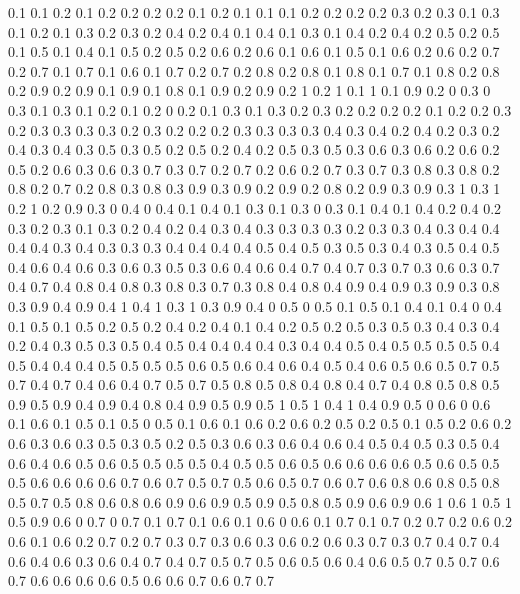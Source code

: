 0.1 0.1
0.2 0.1
0.2 0.2
0.2 0.2
0.1 0.2
0.1 0.1
0.1 0.2
0.2 0.2
0.2 0.3
0.2 0.3
0.1 0.3
0.1 0.2
0.1 0.3
0.2 0.3
0.2 0.4
0.2 0.4
0.1 0.4
0.1 0.3
0.1 0.4
0.2 0.4
0.2 0.5
0.2 0.5
0.1 0.5
0.1 0.4
0.1 0.5
0.2 0.5
0.2 0.6
0.2 0.6
0.1 0.6
0.1 0.5
0.1 0.6
0.2 0.6
0.2 0.7
0.2 0.7
0.1 0.7
0.1 0.6
0.1 0.7
0.2 0.7
0.2 0.8
0.2 0.8
0.1 0.8
0.1 0.7
0.1 0.8
0.2 0.8
0.2 0.9
0.2 0.9
0.1 0.9
0.1 0.8
0.1 0.9
0.2 0.9
0.2 1
0.2 1
0.1 1
0.1 0.9
0.2 0
0.3 0
0.3 0.1
0.3 0.1
0.2 0.1
0.2 0
0.2 0.1
0.3 0.1
0.3 0.2
0.3 0.2
0.2 0.2
0.2 0.1
0.2 0.2
0.3 0.2
0.3 0.3
0.3 0.3
0.2 0.3
0.2 0.2
0.2 0.3
0.3 0.3
0.3 0.4
0.3 0.4
0.2 0.4
0.2 0.3
0.2 0.4
0.3 0.4
0.3 0.5
0.3 0.5
0.2 0.5
0.2 0.4
0.2 0.5
0.3 0.5
0.3 0.6
0.3 0.6
0.2 0.6
0.2 0.5
0.2 0.6
0.3 0.6
0.3 0.7
0.3 0.7
0.2 0.7
0.2 0.6
0.2 0.7
0.3 0.7
0.3 0.8
0.3 0.8
0.2 0.8
0.2 0.7
0.2 0.8
0.3 0.8
0.3 0.9
0.3 0.9
0.2 0.9
0.2 0.8
0.2 0.9
0.3 0.9
0.3 1
0.3 1
0.2 1
0.2 0.9
0.3 0
0.4 0
0.4 0.1
0.4 0.1
0.3 0.1
0.3 0
0.3 0.1
0.4 0.1
0.4 0.2
0.4 0.2
0.3 0.2
0.3 0.1
0.3 0.2
0.4 0.2
0.4 0.3
0.4 0.3
0.3 0.3
0.3 0.2
0.3 0.3
0.4 0.3
0.4 0.4
0.4 0.4
0.3 0.4
0.3 0.3
0.3 0.4
0.4 0.4
0.4 0.5
0.4 0.5
0.3 0.5
0.3 0.4
0.3 0.5
0.4 0.5
0.4 0.6
0.4 0.6
0.3 0.6
0.3 0.5
0.3 0.6
0.4 0.6
0.4 0.7
0.4 0.7
0.3 0.7
0.3 0.6
0.3 0.7
0.4 0.7
0.4 0.8
0.4 0.8
0.3 0.8
0.3 0.7
0.3 0.8
0.4 0.8
0.4 0.9
0.4 0.9
0.3 0.9
0.3 0.8
0.3 0.9
0.4 0.9
0.4 1
0.4 1
0.3 1
0.3 0.9
0.4 0
0.5 0
0.5 0.1
0.5 0.1
0.4 0.1
0.4 0
0.4 0.1
0.5 0.1
0.5 0.2
0.5 0.2
0.4 0.2
0.4 0.1
0.4 0.2
0.5 0.2
0.5 0.3
0.5 0.3
0.4 0.3
0.4 0.2
0.4 0.3
0.5 0.3
0.5 0.4
0.5 0.4
0.4 0.4
0.4 0.3
0.4 0.4
0.5 0.4
0.5 0.5
0.5 0.5
0.4 0.5
0.4 0.4
0.4 0.5
0.5 0.5
0.5 0.6
0.5 0.6
0.4 0.6
0.4 0.5
0.4 0.6
0.5 0.6
0.5 0.7
0.5 0.7
0.4 0.7
0.4 0.6
0.4 0.7
0.5 0.7
0.5 0.8
0.5 0.8
0.4 0.8
0.4 0.7
0.4 0.8
0.5 0.8
0.5 0.9
0.5 0.9
0.4 0.9
0.4 0.8
0.4 0.9
0.5 0.9
0.5 1
0.5 1
0.4 1
0.4 0.9
0.5 0
0.6 0
0.6 0.1
0.6 0.1
0.5 0.1
0.5 0
0.5 0.1
0.6 0.1
0.6 0.2
0.6 0.2
0.5 0.2
0.5 0.1
0.5 0.2
0.6 0.2
0.6 0.3
0.6 0.3
0.5 0.3
0.5 0.2
0.5 0.3
0.6 0.3
0.6 0.4
0.6 0.4
0.5 0.4
0.5 0.3
0.5 0.4
0.6 0.4
0.6 0.5
0.6 0.5
0.5 0.5
0.5 0.4
0.5 0.5
0.6 0.5
0.6 0.6
0.6 0.6
0.5 0.6
0.5 0.5
0.5 0.6
0.6 0.6
0.6 0.7
0.6 0.7
0.5 0.7
0.5 0.6
0.5 0.7
0.6 0.7
0.6 0.8
0.6 0.8
0.5 0.8
0.5 0.7
0.5 0.8
0.6 0.8
0.6 0.9
0.6 0.9
0.5 0.9
0.5 0.8
0.5 0.9
0.6 0.9
0.6 1
0.6 1
0.5 1
0.5 0.9
0.6 0
0.7 0
0.7 0.1
0.7 0.1
0.6 0.1
0.6 0
0.6 0.1
0.7 0.1
0.7 0.2
0.7 0.2
0.6 0.2
0.6 0.1
0.6 0.2
0.7 0.2
0.7 0.3
0.7 0.3
0.6 0.3
0.6 0.2
0.6 0.3
0.7 0.3
0.7 0.4
0.7 0.4
0.6 0.4
0.6 0.3
0.6 0.4
0.7 0.4
0.7 0.5
0.7 0.5
0.6 0.5
0.6 0.4
0.6 0.5
0.7 0.5
0.7 0.6
0.7 0.6
0.6 0.6
0.6 0.5
0.6 0.6
0.7 0.6
0.7 0.7

